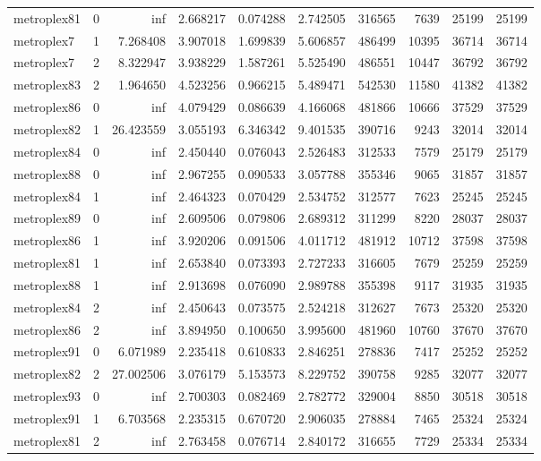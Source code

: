 \documentclass[../../../thesis.tex]{subfiles}
\begin{document}
\begin{longtable}{|l|r|r|r|r|r|r|r|r|r|}
metroplex81 & 0 & inf & 2.668217 & 0.074288 & 2.742505 & 316565 & 7639 & 25199 & 25199 \\
metroplex7 & 1 & 7.268408 & 3.907018 & 1.699839 & 5.606857 & 486499 & 10395 & 36714 & 36714 \\
metroplex7 & 2 & 8.322947 & 3.938229 & 1.587261 & 5.525490 & 486551 & 10447 & 36792 & 36792 \\
metroplex83 & 2 & 1.964650 & 4.523256 & 0.966215 & 5.489471 & 542530 & 11580 & 41382 & 41382 \\
metroplex86 & 0 & inf & 4.079429 & 0.086639 & 4.166068 & 481866 & 10666 & 37529 & 37529 \\
metroplex82 & 1 & 26.423559 & 3.055193 & 6.346342 & 9.401535 & 390716 & 9243 & 32014 & 32014 \\
metroplex84 & 0 & inf & 2.450440 & 0.076043 & 2.526483 & 312533 & 7579 & 25179 & 25179 \\
metroplex88 & 0 & inf & 2.967255 & 0.090533 & 3.057788 & 355346 & 9065 & 31857 & 31857 \\
metroplex84 & 1 & inf & 2.464323 & 0.070429 & 2.534752 & 312577 & 7623 & 25245 & 25245 \\
metroplex89 & 0 & inf & 2.609506 & 0.079806 & 2.689312 & 311299 & 8220 & 28037 & 28037 \\
metroplex86 & 1 & inf & 3.920206 & 0.091506 & 4.011712 & 481912 & 10712 & 37598 & 37598 \\
metroplex81 & 1 & inf & 2.653840 & 0.073393 & 2.727233 & 316605 & 7679 & 25259 & 25259 \\
metroplex88 & 1 & inf & 2.913698 & 0.076090 & 2.989788 & 355398 & 9117 & 31935 & 31935 \\
metroplex84 & 2 & inf & 2.450643 & 0.073575 & 2.524218 & 312627 & 7673 & 25320 & 25320 \\
metroplex86 & 2 & inf & 3.894950 & 0.100650 & 3.995600 & 481960 & 10760 & 37670 & 37670 \\
metroplex91 & 0 & 6.071989 & 2.235418 & 0.610833 & 2.846251 & 278836 & 7417 & 25252 & 25252 \\
metroplex82 & 2 & 27.002506 & 3.076179 & 5.153573 & 8.229752 & 390758 & 9285 & 32077 & 32077 \\
metroplex93 & 0 & inf & 2.700303 & 0.082469 & 2.782772 & 329004 & 8850 & 30518 & 30518 \\
metroplex91 & 1 & 6.703568 & 2.235315 & 0.670720 & 2.906035 & 278884 & 7465 & 25324 & 25324 \\
metroplex81 & 2 & inf & 2.763458 & 0.076714 & 2.840172 & 316655 & 7729 & 25334 & 25334 \\

\end{longtable}
\end{document}
